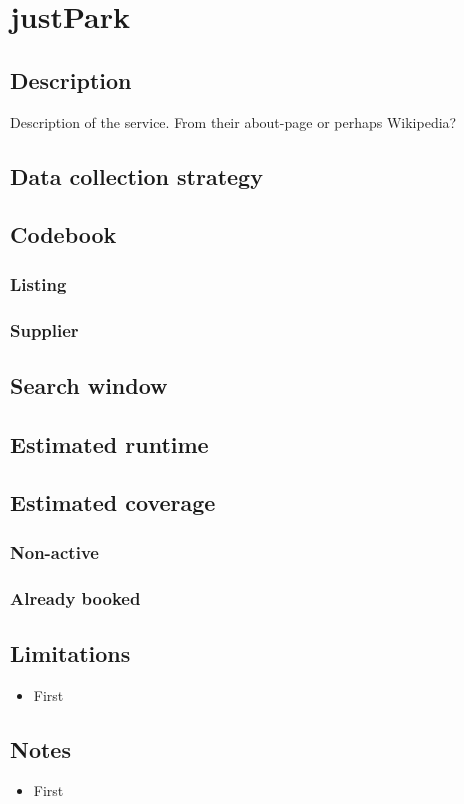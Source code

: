 \section{ justPark }
\subsection{Description}
Description of the service. From their about-page or perhaps Wikipedia?

\subsection{Data collection strategy}

\subsection{Codebook}
\subsubsection{Listing}
\subsubsection{Supplier}

\subsection{Search window}

\subsection{Estimated runtime}

\subsection{Estimated coverage}
\subsubsection{Non-active}
\subsubsection{Already booked}

\subsection{Limitations}
\begin{itemize}
\item First
\end{itemize}

\subsection{Notes}
\begin{itemize}
\item First
\end{itemize}


